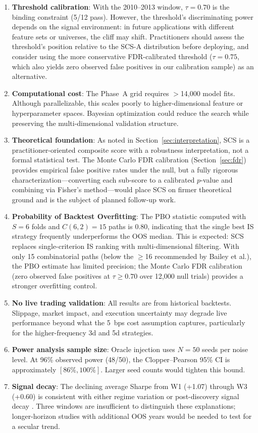 \documentclass[12pt,a4paper]{article}
\begin{document}
\begin{enumerate}
  \item \textbf{Threshold calibration}: With the 2010--2013 window, $\tau=0.70$ is the binding constraint (5/12 pass). However, the threshold's discriminating power depends on the signal environment: in future applications with different feature sets or universes, the cliff may shift. Practitioners should assess the threshold's position relative to the SCS-A distribution before deploying, and consider using the more conservative FDR-calibrated threshold ($\tau=0.75$, which also yields zero observed false positives in our calibration sample) as an alternative.
  \item \textbf{Computational cost}: The Phase~A grid requires $>$14,000 model fits. Although parallelizable, this scales poorly to higher-dimensional feature or hyperparameter spaces. Bayesian optimization could reduce the search while preserving the multi-dimensional validation structure.
  \item \textbf{Theoretical foundation}: As noted in Section~\ref{sec:interpretation}, SCS is a practitioner-oriented composite score with a robustness interpretation, not a formal statistical test. The Monte Carlo FDR calibration (Section~\ref{sec:fdr}) provides empirical false positive rates under the null, but a fully rigorous characterization---converting each sub-score to a calibrated $p$-value and combining via Fisher's method---would place SCS on firmer theoretical ground and is the subject of planned follow-up work.
  \item \textbf{Probability of Backtest Overfitting}: The PBO statistic \citep{bailey2017probability} computed with $S=6$ folds and $C(6,2)=15$ paths is 0.80, indicating that the single best IS strategy frequently underperforms the OOS median. This is expected: SCS replaces single-criterion IS ranking with multi-dimensional filtering. With only 15 combinatorial paths (below the $\geq$16 recommended by Bailey et al.), the PBO estimate has limited precision; the Monte Carlo FDR calibration (zero observed false positives at $\tau \geq 0.70$ over 12{,}000 null trials) provides a stronger overfitting control.
  \item \textbf{No live trading validation}: All results are from historical backtests. Slippage, market impact, and execution uncertainty may degrade live performance beyond what the 5~bps cost assumption captures, particularly for the higher-frequency 3d and 5d strategies.
  \item \textbf{Power analysis sample size}: Oracle injection uses $N=50$ seeds per noise level. At 96\% observed power (48/50), the Clopper--Pearson 95\% CI is approximately $[86\%, 100\%]$. Larger seed counts would tighten this bound.
  \item \textbf{Signal decay}: The declining average Sharpe from W1 (+1.07) through W3 (+0.60) is consistent with either regime variation or post-discovery signal decay \citep{mclean2016does}. Three windows are insufficient to distinguish these explanations; longer-horizon studies with additional OOS years would be needed to test for a secular trend.
\end{enumerate}
\end{document}
